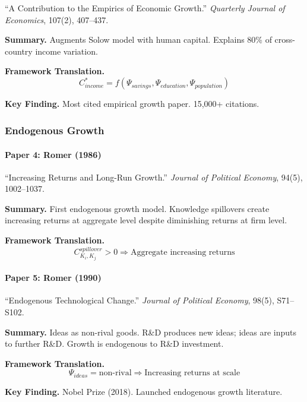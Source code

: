 ``A Contribution to the Empirics of Economic Growth.''
\textit{Quarterly Journal of Economics}, 107(2), 407--437.

\textbf{Summary.}
Augments Solow model with human capital. Explains 80\% of cross-country 
income variation.

\textbf{Framework Translation.}
\begin{equation}
C^*_{income} = f(\Psi_{savings}, \Psi_{education}, \Psi_{population})
\end{equation}

\textbf{Key Finding.}
Most cited empirical growth paper. 15,000+ citations.

\subsubsection{Endogenous Growth}

\paragraph{Paper 4: Romer (1986)}

``Increasing Returns and Long-Run Growth.''
\textit{Journal of Political Economy}, 94(5), 1002--1037.

\textbf{Summary.}
First endogenous growth model. Knowledge spillovers create increasing returns 
at aggregate level despite diminishing returns at firm level.

\textbf{Framework Translation.}
\begin{equation}
C_{K_i, K_j}^{spillover} > 0 \Rightarrow \text{Aggregate increasing returns}
\end{equation}

\paragraph{Paper 5: Romer (1990)}

``Endogenous Technological Change.''
\textit{Journal of Political Economy}, 98(5), S71--S102.

\textbf{Summary.}
Ideas as non-rival goods. R\&D produces new ideas; ideas are inputs to 
further R\&D. Growth is endogenous to R\&D investment.

\textbf{Framework Translation.}
\begin{equation}
\Psi_{ideas} = \text{non-rival} \Rightarrow \text{Increasing returns at scale}
\end{equation}

\textbf{Key Finding.}
Nobel Prize (2018). Launched endogenous growth literature.

